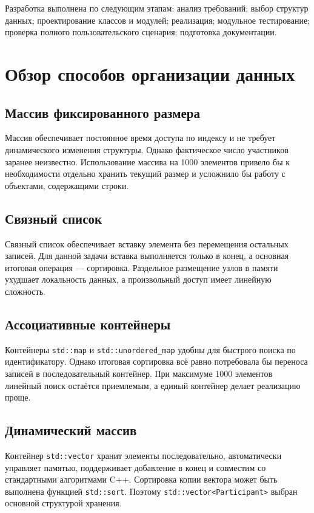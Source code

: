 \documentclass[14pt,a4paper]{extarticle}
\newcommand{\code}[1]{\texttt{#1}}
\begin{document}
Разработка выполнена по следующим этапам: анализ требований; выбор структур данных; проектирование классов и модулей; реализация; модульное тестирование; проверка полного пользовательского сценария; подготовка документации.

\clearpage
\section{Обзор способов организации данных}

\subsection{Массив фиксированного размера}

Массив обеспечивает постоянное время доступа по индексу и не требует динамического изменения структуры. Однако фактическое число участников заранее неизвестно. Использование массива на 1000 элементов привело бы к необходимости отдельно хранить текущий размер и усложнило бы работу с объектами, содержащими строки.

\subsection{Связный список}

Связный список обеспечивает вставку элемента без перемещения остальных записей. Для данной задачи вставка выполняется только в конец, а основная итоговая операция --- сортировка. Раздельное размещение узлов в памяти ухудшает локальность данных, а произвольный доступ имеет линейную сложность.

\subsection{Ассоциативные контейнеры}

Контейнеры \code{std::map} и \code{std::unordered\_map} удобны для быстрого поиска по идентификатору. Однако итоговая сортировка всё равно потребовала бы переноса записей в последовательный контейнер. При максимуме 1000 элементов линейный поиск остаётся приемлемым, а единый контейнер делает реализацию проще.

\subsection{Динамический массив}

Контейнер \code{std::vector} хранит элементы последовательно, автоматически управляет памятью, поддерживает добавление в конец и совместим со стандартными алгоритмами C++. Сортировка копии вектора может быть выполнена функцией \code{std::sort}. Поэтому \code{std::vector<Participant>} выбран основной структурой хранения.
\end{document}
